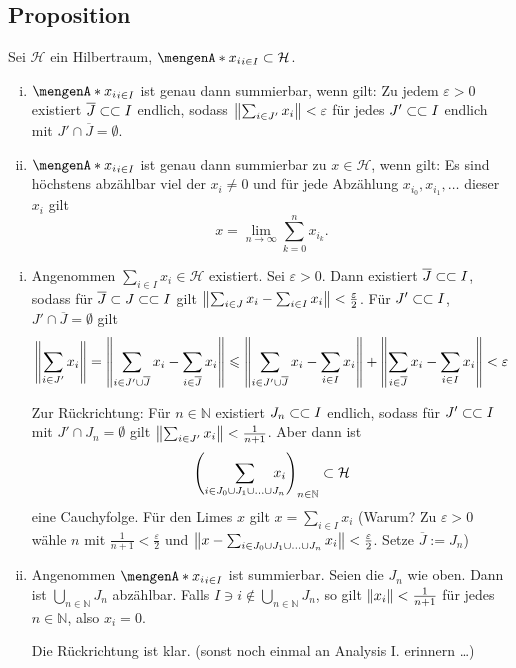 \subsection{Proposition} %
\label{sub:717}
Sei $\mathcal{H}$ ein Hilbertraum, $\set{x_i}_{i \in I} \subset \mathcal{H}$. 
\begin{enumerate}[(i)]
	\item $\set{x_i}_{i \in I}$ ist genau dann summierbar, wenn gilt: Zu jedem $\varepsilon>0$ existiert $\overline{J} \finSub I$ endlich, sodass 
	$\norm{\sum_{i \in J'}x_i}< \varepsilon$ für jedes $J' \finSub I$ endlich mit $J' \cap \overline{J} = \emptyset$.
	\item $\set{x_i}_{i \in I}$ ist genau dann summierbar zu $x \in \mathcal{H}$, wenn gilt: Es sind höchstens abzählbar viel der $x_i \not=0$ und für jede Abzählung 
	$x_{i_0}, x_{i_1}, \ldots $ dieser $x_i$ gilt 
	\[
		x= \lim_{n \to \infty} \sum_{k=0}^{n} x_{i_k}.
	\]
\end{enumerate}
\begin{enumerate}[(i)]
	\item Angenommen $\sum_{i\in I} x_i \in \mathcal{H}$ existiert. Sei $\varepsilon>0$. Dann existiert $\overline{J}\finSub I$, sodass für $\overline{J}\subset J\finSub I$ 
	gilt $\norm{\sum_{i \in J} x_i - \sum_{i \in I} x_i} < \frac{\varepsilon}{2}$. Für $J' \finSub I$, $J' \cap \overline{J}=\emptyset$ gilt
	\begin{align*}
		\norm{\sum_{i \in J'} x_i} = \norm{\sum_{i \in J' \cup \overline{J}} x_i - \sum_{i \in \overline{J}} x_i}  \le \norm{\sum_{i \in J' \cup \overline{J}}x_i - \sum_{i \in I} x_i} + \norm{\sum_{i \in \overline{J}} x_i - \sum_{i \in I}x_i}< \varepsilon  
	\end{align*}
	
	Zur Rückrichtung: Für $n \in \mathds{N}$ existiert $J_n \finSub I$ endlich, sodass für $J' \finSub I$ mit $J' \cap J_n = \emptyset$ gilt 
	$\norm{\sum_{i \in J'} x_i}< \frac{1}{n+1}$. Aber dann ist 
	\begin{align*}
		\enbrace*{\sum_{i \in J_0 \cup J_1 \cup \ldots \cup J_n} \hspace{-1em} x_i}_{n \in \mathds{N}} \subset \mathcal{H}
	\end{align*}
	eine Cauchyfolge. Für den Limes $x$ gilt $x= \sum_{i \in I} x_i$ (Warum? Zu $\varepsilon>0$ wähle $n$ mit $\frac{1}{n+1}<\frac{\varepsilon}{2}$ und 
	$\norm{x - \sum_{i \in J_0 \cup J_1 \cup \ldots \cup J_n} x_i}< \frac{\varepsilon}{2}$. Setze $\overline{J}:= J_n$)
	\item Angenommen $\set{x_i}_{i \in I}$ ist summierbar. Seien die $J_n$ wie oben. Dann ist $\bigcup_{n \in \mathds{N}} J_n$ abzählbar. Falls 
	$I \ni i \not\in \bigcup_{n \in \mathds{N}} J_n$, so gilt $\norm{x_i} < \frac{1}{n+1}$ für jedes $n \in \mathds{N}$, also $x_i=0$.
	
	Die Rückrichtung ist klar. (sonst noch einmal an Analysis I. erinnern \ldots ) \bewende
\end{enumerate}

